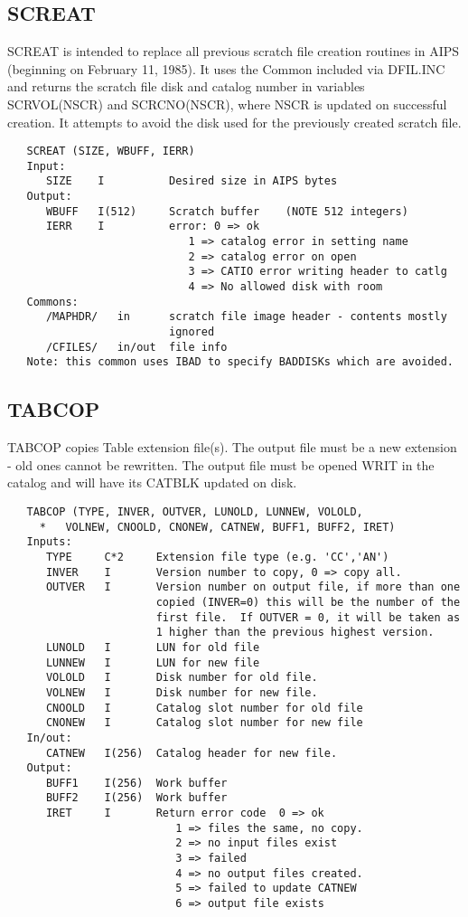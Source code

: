 \subsection{SCREAT}
SCREAT is intended to replace all previous scratch file creation
routines in AIPS (beginning on February 11, 1985).  It uses the
Common included via DFIL.INC and returns
the scratch file disk and catalog number in variables SCRVOL(NSCR)
and SCRCNO(NSCR), where NSCR is updated on successful creation.
It attempts to avoid the disk used for the previously created
scratch file.
\begin{verbatim}
   SCREAT (SIZE, WBUFF, IERR)
   Input:
      SIZE    I          Desired size in AIPS bytes
   Output:
      WBUFF   I(512)     Scratch buffer    (NOTE 512 integers)
      IERR    I          error: 0 => ok
                            1 => catalog error in setting name
                            2 => catalog error on open
                            3 => CATIO error writing header to catlg
                            4 => No allowed disk with room
   Commons:
      /MAPHDR/   in      scratch file image header - contents mostly
                         ignored
      /CFILES/   in/out  file info
   Note: this common uses IBAD to specify BADDISKs which are avoided.
\end{verbatim}

\subsection{TABCOP}
TABCOP copies Table extension file(s).  The output file must be a
new extension - old ones cannot be rewritten.  The output file
must be opened WRIT in the catalog and will have its CATBLK
updated on disk.
\begin{verbatim}
   TABCOP (TYPE, INVER, OUTVER, LUNOLD, LUNNEW, VOLOLD,
     *   VOLNEW, CNOOLD, CNONEW, CATNEW, BUFF1, BUFF2, IRET)
   Inputs:
      TYPE     C*2     Extension file type (e.g. 'CC','AN')
      INVER    I       Version number to copy, 0 => copy all.
      OUTVER   I       Version number on output file, if more than one
                       copied (INVER=0) this will be the number of the
                       first file.  If OUTVER = 0, it will be taken as
                       1 higher than the previous highest version.
      LUNOLD   I       LUN for old file
      LUNNEW   I       LUN for new file
      VOLOLD   I       Disk number for old file.
      VOLNEW   I       Disk number for new file.
      CNOOLD   I       Catalog slot number for old file
      CNONEW   I       Catalog slot number for new file
   In/out:
      CATNEW   I(256)  Catalog header for new file.
   Output:
      BUFF1    I(256)  Work buffer
      BUFF2    I(256)  Work buffer
      IRET     I       Return error code  0 => ok
                          1 => files the same, no copy.
                          2 => no input files exist
                          3 => failed
                          4 => no output files created.
                          5 => failed to update CATNEW
                          6 => output file exists
\end{verbatim}

